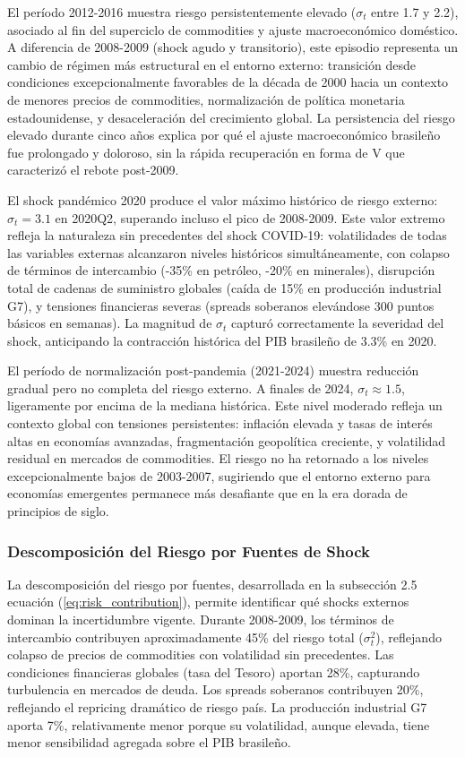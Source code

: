 \documentclass[3p,11pt,draft,natbib=false]{elsarticle}
\begin{document}
El período 2012-2016 muestra riesgo persistentemente elevado ($\sigma_t$ entre 1.7 y 2.2), asociado al fin del superciclo de commodities y ajuste macroeconómico doméstico. A diferencia de 2008-2009 (shock agudo y transitorio), este episodio representa un cambio de régimen más estructural en el entorno externo: transición desde condiciones excepcionalmente favorables de la década de 2000 hacia un contexto de menores precios de commodities, normalización de política monetaria estadounidense, y desaceleración del crecimiento global. La persistencia del riesgo elevado durante cinco años explica por qué el ajuste macroeconómico brasileño fue prolongado y doloroso, sin la rápida recuperación en forma de V que caracterizó el rebote post-2009.

El shock pandémico 2020 produce el valor máximo histórico de riesgo externo: $\sigma_t = 3.1$ en 2020Q2, superando incluso el pico de 2008-2009. Este valor extremo refleja la naturaleza sin precedentes del shock COVID-19: volatilidades de todas las variables externas alcanzaron niveles históricos simultáneamente, con colapso de términos de intercambio (-35\% en petróleo, -20\% en minerales), disrupción total de cadenas de suministro globales (caída de 15\% en producción industrial G7), y tensiones financieras severas (spreads soberanos elevándose 300 puntos básicos en semanas). La magnitud de $\sigma_t$ capturó correctamente la severidad del shock, anticipando la contracción histórica del PIB brasileño de 3.3\% en 2020.

El período de normalización post-pandemia (2021-2024) muestra reducción gradual pero no completa del riesgo externo. A finales de 2024, $\sigma_t \approx 1.5$, ligeramente por encima de la mediana histórica. Este nivel moderado refleja un contexto global con tensiones persistentes: inflación elevada y tasas de interés altas en economías avanzadas, fragmentación geopolítica creciente, y volatilidad residual en mercados de commodities. El riesgo no ha retornado a los niveles excepcionalmente bajos de 2003-2007, sugiriendo que el entorno externo para economías emergentes permanece más desafiante que en la era dorada de principios de siglo.

\subsubsection{Descomposición del Riesgo por Fuentes de Shock}

La descomposición del riesgo por fuentes, desarrollada en la subsección 2.5 ecuación (\ref{eq:risk_contribution}), permite identificar qué shocks externos dominan la incertidumbre vigente. Durante 2008-2009, los términos de intercambio contribuyen aproximadamente 45\% del riesgo total ($\sigma_t^2$), reflejando colapso de precios de commodities con volatilidad sin precedentes. Las condiciones financieras globales (tasa del Tesoro) aportan 28\%, capturando turbulencia en mercados de deuda. Los spreads soberanos contribuyen 20\%, reflejando el repricing dramático de riesgo país. La producción industrial G7 aporta 7\%, relativamente menor porque su volatilidad, aunque elevada, tiene menor sensibilidad agregada sobre el PIB brasileño.
\end{document}
